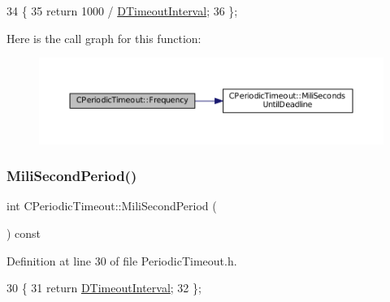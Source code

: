 \begin{DoxyCode}
34                              \{
35             \textcolor{keywordflow}{return} 1000 / \hyperlink{classCPeriodicTimeout_ab0c2b821c02366c9638a66eced3c1f34}{DTimeoutInterval};  
36         \};
\end{DoxyCode}
Here is the call graph for this function\+:
\nopagebreak
\begin{figure}[H]
\begin{center}
\leavevmode
\includegraphics[width=350pt]{classCPeriodicTimeout_af5a198bf926337b0f4470d0b77bca542_cgraph}
\end{center}
\end{figure}
\hypertarget{classCPeriodicTimeout_ad5e27bd939d6452b0667d0c5ef74247e}{}\label{classCPeriodicTimeout_ad5e27bd939d6452b0667d0c5ef74247e} 
\subsubsection{\texorpdfstring{Mili\+Second\+Period()}{MiliSecondPeriod()}}
{\footnotesize\ttfamily int C\+Periodic\+Timeout\+::\+Mili\+Second\+Period (\begin{DoxyParamCaption}{ }\end{DoxyParamCaption}) const\hspace{0.3cm}{\ttfamily [inline]}}



Definition at line 30 of file Periodic\+Timeout.\+h.


\begin{DoxyCode}
30                                     \{
31             \textcolor{keywordflow}{return} \hyperlink{classCPeriodicTimeout_ab0c2b821c02366c9638a66eced3c1f34}{DTimeoutInterval}; 
32         \};
\end{DoxyCode}
\hypertarget{classCPeriodicTimeout_a5d32d0a29ba5efa718f3489cb9fb2340}{}\label{classCPeriodicTimeout_a5d32d0a29ba5efa718f3489cb9fb2340} 
